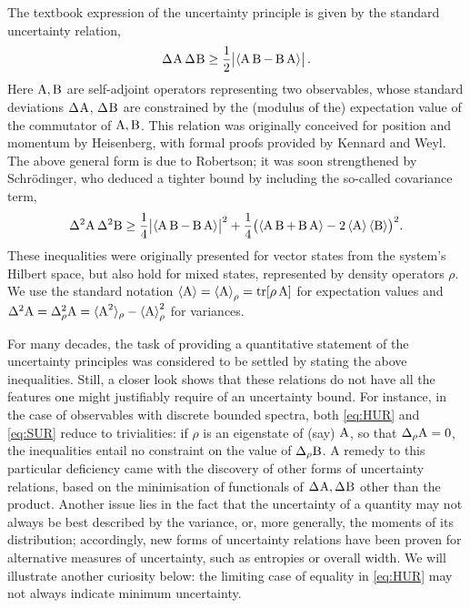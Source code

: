 The textbook expression of the uncertainty principle is given by the standard uncertainty relation,
\begin{equation}\label{eq:HUR}
  \sdev{\opa}\,\sdev{\opb}\ge \frac12\bigl| \expnr{\comm{\opa}{\opb}}\bigr|\,.
\end{equation}
Here $\operatorname{A},\operatorname{B}$ are self-adjoint operators representing two observables, whose standard deviations $\sdev{\opa}$, $\sdev{\opb}$ are constrained by the (modulus of the) expectation value of the commutator of $\operatorname{A},\operatorname{B}$. This relation was originally conceived for position and momentum by Heisenberg\cite{Heisenberg1927-Wheeler+Zurek}, with formal proofs provided by Kennard\cite{Kennard1927} and Weyl\cite{Weyl1927}. The above general form is due to Robertson\cite{Robertson1929}; it was soon strengthened by Schr\"odinger\cite{Schrodinger1930}, who deduced a tighter bound by including the so-called covariance term,
\begin{equation}\label{eq:SUR}
  \var{\opa}\,\var{\opb}\ge\frac14\bigl| \expnr{\comm{\opa}{\opb}} \bigr|^2 + \frac14\bigl(\expnr{\acom\opa\opb}-2\expnr{\opa}\expnr{\opb}\bigr)^2.
\end{equation}
These inequalities were originally presented for vector states from the system's Hilbert space, but also hold for mixed states, represented by density operators $\rho$. We use the standard notation $\left\langle {\operatorname{A}}\right\rangle=\left\langle {\operatorname{A}}\right\rangle_\rho =\operatorname{tr}[\rho\operatorname{A}]$ for expectation values and $\var{\opa}=\varr{\opa}=\langle\opa^2\rangle_\rho-\expr{\opa}^2$ for variances. 

For many decades, the task of providing a quantitative statement of the uncertainty principles was considered to be settled by stating the above inequalities.
Still, a closer look shows that these relations do not have all the features one might justifiably require of an uncertainty bound. For instance, in the case of observables with discrete bounded spectra, both \eqref{eq:HUR} and \eqref{eq:SUR} reduce to trivialities: if $\rho$ is an eigenstate of (say) $\operatorname{A}$, so that $\sdevr{\opa}=0$, the inequalities entail no constraint on the value of $\sdevr{\opb}$. A remedy to this particular deficiency came with the discovery of other forms of uncertainty relations, based on the minimisation of functionals of $\sdev{\opa}, \sdev{\opb}$ other than the product\cite{MacconePatti2014PRL,Huang2012}. Another issue lies in the fact that the uncertainty of a quantity may not always be best described by the variance, or, more generally, the moments of its distribution; accordingly, new forms of uncertainty relations have been proven for alternative measures of uncertainty, such as entropies\cite{Bialynicki-BirulaMycielski1975,Deutsch1983,MaassenUffink1988} or overall width\cite{UffinkHilgevoord1985}. We will illustrate another curiosity below: the limiting case of equality in \eqref{eq:HUR} may not always indicate minimum uncertainty.

